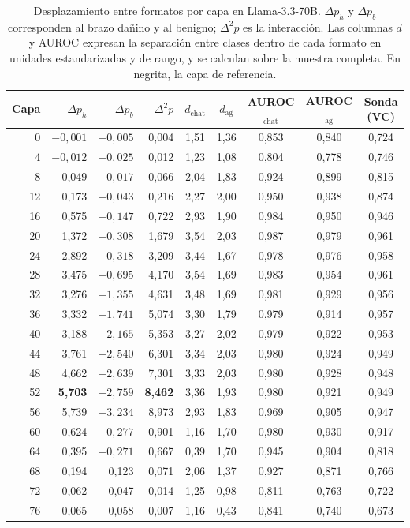 \documentclass[12pt,a4paper]{article}
\begin{document}
\begin{table}[htbp]
\centering
\small
\setlength{\tabcolsep}{4pt}
\begin{tabular}{@{}rrrrccccc@{}}
\toprule
Capa & $\Delta p_{h}$ & $\Delta p_{b}$ & $\Delta^{2} p$ & $d_{\text{chat}}$ & $d_{\text{ag}}$ & AUROC$_{\text{chat}}$ & AUROC$_{\text{ag}}$ & Sonda (VC) \\
\midrule
0  & $-0{,}001$ & $-0{,}005$ & 0,004 & 1,51 & 1,36 & 0,853 & 0,840 & 0,724 \\
4  & $-0{,}012$ & $-0{,}025$ & 0,012 & 1,23 & 1,08 & 0,804 & 0,778 & 0,746 \\
8  & 0,049 & $-0{,}017$ & 0,066 & 2,04 & 1,83 & 0,924 & 0,899 & 0,815 \\
12 & 0,173 & $-0{,}043$ & 0,216 & 2,27 & 2,00 & 0,950 & 0,938 & 0,874 \\
16 & 0,575 & $-0{,}147$ & 0,722 & 2,93 & 1,90 & 0,984 & 0,950 & 0,946 \\
20 & 1,372 & $-0{,}308$ & 1,679 & 3,54 & 2,03 & 0,987 & 0,979 & 0,961 \\
24 & 2,892 & $-0{,}318$ & 3,209 & 3,44 & 1,67 & 0,978 & 0,976 & 0,958 \\
28 & 3,475 & $-0{,}695$ & 4,170 & 3,54 & 1,69 & 0,983 & 0,954 & 0,961 \\
32 & 3,276 & $-1{,}355$ & 4,631 & 3,48 & 1,69 & 0,981 & 0,929 & 0,956 \\
36 & 3,332 & $-1{,}741$ & 5,074 & 3,30 & 1,79 & 0,979 & 0,914 & 0,957 \\
40 & 3,188 & $-2{,}165$ & 5,353 & 3,27 & 2,02 & 0,979 & 0,922 & 0,953 \\
44 & 3,761 & $-2{,}540$ & 6,301 & 3,34 & 2,03 & 0,980 & 0,924 & 0,949 \\
48 & 4,662 & $-2{,}639$ & 7,301 & 3,33 & 2,03 & 0,980 & 0,928 & 0,948 \\
52 & \textbf{5,703} & $-2{,}759$ & \textbf{8,462} & 3,36 & 1,93 & 0,980 & 0,921 & 0,949 \\
56 & 5,739 & $-3{,}234$ & 8,973 & 2,93 & 1,83 & 0,969 & 0,905 & 0,947 \\
60 & 0,624 & $-0{,}277$ & 0,901 & 1,16 & 1,70 & 0,980 & 0,930 & 0,917 \\
64 & 0,395 & $-0{,}271$ & 0,667 & 0,39 & 1,70 & 0,945 & 0,904 & 0,818 \\
68 & 0,194 & 0,123 & 0,071 & 2,06 & 1,37 & 0,927 & 0,871 & 0,766 \\
72 & 0,062 & 0,047 & 0,014 & 1,25 & 0,98 & 0,811 & 0,763 & 0,722 \\
76 & 0,065 & 0,058 & 0,007 & 1,16 & 0,43 & 0,841 & 0,740 & 0,673 \\
\bottomrule
\end{tabular}
\caption{Desplazamiento entre formatos por capa en Llama-3.3-70B. $\Delta p_{h}$ y $\Delta p_{b}$ corresponden al brazo dañino y al benigno; $\Delta^{2} p$ es la interacción. Las columnas $d$ y AUROC expresan la separación entre clases dentro de cada formato en unidades estandarizadas y de rango, y se calculan sobre la muestra completa. En negrita, la capa de referencia.}
\label{tab:porcapa}
\end{table}
\end{document}
